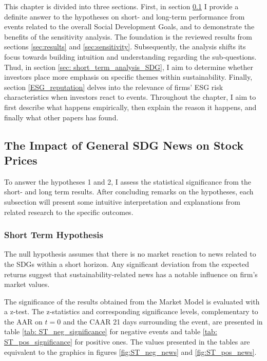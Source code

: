 
This chapter is divided into three sections. First, in section \ref{sec: short_term_analysis} I provide a definite answer to the hypotheses on short- and long-term performance from events related to the overall Social Development Goals, and to demonstrate the benefits of the sensitivity analysis. The foundation is the reviewed results from sections \ref{sec:results} and \ref{sec:sensitivity}. 
Subsequently, the analysis shifts its focus towards building intuition and understanding regarding the sub-questions. Thud, in section \ref{sec: short_term_analysis_SDG}, I aim to determine whether investors place more emphasis on specific themes within sustainability. Finally, section \ref{ESG_reputation} delves into the relevance of firms' ESG risk characteristics when investors react to events. Throughout the chapter, I aim to first describe what happens empirically, then explain the reason it happens, and finally what other papers has found. 

\subsection{The Impact of General SDG News on Stock Prices} \label{sec: short_term_analysis}
To answer the hypotheses 1 and 2, I assess the statistical significance from the short- and long term results. After concluding remarks on the hypotheses, each subsection will present some intuitive interpretation and explanations from related research to the specific outcomes.

\subsubsection{Short Term Hypothesis} 

The null hypothesis assumes that there is no market reaction to news related to the SDGs within a short horizon. Any significant deviation from the expected returns suggest that sustainability-related news has a notable influence on firm's market values.  

The significance of the results obtained from the Market Model is evaluated with a z-test. The z-statistics and corresponding significance levels, complementary to the AAR on $t=0$ and the CAAR 21 days surrounding the event, are presented in table \ref{tab: ST_neg_significance} for negative events and table \ref{tab: ST_pos_significance} for positive ones. The values presented in the tables are equivalent to the graphics in figures \ref{fig:ST_neg_news} and \ref{fig:ST_pos_news}. 

